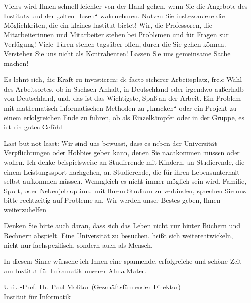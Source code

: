 Vieles wird Ihnen schnell leichter von der Hand gehen, wenn Sie die Angebote des Instituts und der „alten Hasen“ wahrnehmen. Nutzen Sie insbesondere die Möglichkeiten, die ein kleines Institut bietet! Wir, die Professoren, die Mitarbeiterinnen und Mitarbeiter stehen bei Problemen und für Fragen zur Verfügung! Viele Türen stehen tagsüber offen, durch die Sie gehen können. Verstehen Sie uns nicht als Kontrahenten! Lassen Sie uns gemeinsame Sache machen! 

Es lohnt sich, die Kraft zu investieren: de facto sicherer Arbeitsplatz, freie Wahl des Arbeitsortes, ob in Sachsen-Anhalt, in Deutschland oder irgendwo außerhalb von Deutschland, und, das ist das Wichtigste, Spaß an der Arbeit. Ein Problem mit mathematisch-informatischen Methoden zu „knacken“ oder ein Projekt zu einem erfolgreichen Ende zu führen, ob als Einzelkämpfer oder in der Gruppe, es ist ein gutes Gefühl.
 
Last but not least: Wir sind uns bewusst, dass es neben der Universität Verpflichtungen oder Hobbies geben kann, denen Sie nachkommen müssen oder wollen. Ich denke beispielsweise an Studierende mit Kindern, an Studierende, die einem Leistungssport nachgehen, an Studierende, die für  ihren Lebensunterhalt selbst aufkommen müssen. Wenngleich es nicht immer möglich sein wird, Familie, Sport, oder Nebenjob optimal mit Ihrem Studium zu verbinden, sprechen Sie uns bitte rechtzeitig auf Probleme an. Wir werden unser Bestes geben, Ihnen weiterzuhelfen.

Denken Sie bitte auch daran, dass sich das Leben nicht nur hinter Büchern und Rechnern abspielt. Eine Universität zu besuchen, heißt sich weiterentwickeln, nicht nur fachspezifisch, sondern auch als Mensch. 

In diesem Sinne wünsche ich Ihnen eine spannende, erfolgreiche und schöne Zeit am Institut für Informatik unserer Alma Mater.

Univ.-Prof. Dr. Paul Molitor (Geschäftsführender Direktor)\\
Institut für Informatik
